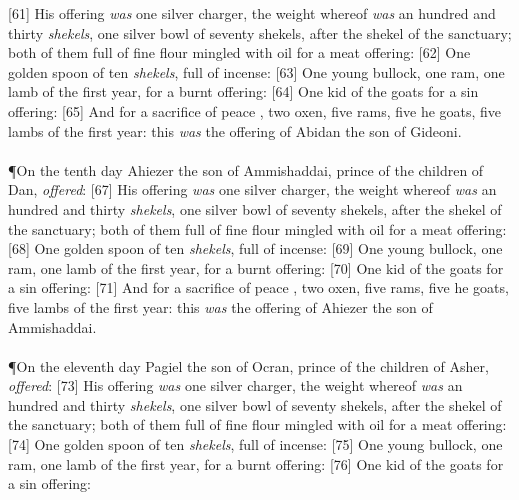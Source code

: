[61] \textcolor[cmyk]{0.99998,1,0,0}{His offering \emph{was} one silver charger, the weight whereof \emph{was} an hundred and thirty \emph{shekels}, one silver bowl of seventy shekels, after the shekel of the sanctuary; both of them full of fine flour mingled with oil for a meat offering:}
[62] \textcolor[cmyk]{0.99998,1,0,0}{One golden spoon of ten \emph{shekels}, full of incense:}
[63] \textcolor[cmyk]{0.99998,1,0,0}{One young bullock, one ram, one lamb of the first year, for a burnt offering:}
[64] \textcolor[cmyk]{0.99998,1,0,0}{One kid of the goats for a sin offering:}
[65] \textcolor[cmyk]{0.99998,1,0,0}{And for a sacrifice of peace , two oxen, five rams, five he goats, five lambs of the first year: this \emph{was} the offering of Abidan the son of Gideoni.}\\
\\
\P \textcolor[cmyk]{0.99998,1,0,0}{On the tenth day Ahiezer the son of Ammishaddai, prince of the children of Dan, \emph{offered}:}
[67] \textcolor[cmyk]{0.99998,1,0,0}{His offering \emph{was} one silver charger, the weight whereof \emph{was} an hundred and thirty \emph{shekels}, one silver bowl of seventy shekels, after the shekel of the sanctuary; both of them full of fine flour mingled with oil for a meat offering:}
[68] \textcolor[cmyk]{0.99998,1,0,0}{One golden spoon of ten \emph{shekels}, full of incense:}
[69] \textcolor[cmyk]{0.99998,1,0,0}{One young bullock, one ram, one lamb of the first year, for a burnt offering:}
[70] \textcolor[cmyk]{0.99998,1,0,0}{One kid of the goats for a sin offering:}
[71] \textcolor[cmyk]{0.99998,1,0,0}{And for a sacrifice of peace , two oxen, five rams, five he goats, five lambs of the first year: this \emph{was} the offering of Ahiezer the son of Ammishaddai.}\\
\\
\P \textcolor[cmyk]{0.99998,1,0,0}{On the eleventh day Pagiel the son of Ocran, prince of the children of Asher, \emph{offered}:}
[73] \textcolor[cmyk]{0.99998,1,0,0}{His offering \emph{was} one silver charger, the weight whereof \emph{was} an hundred and thirty \emph{shekels}, one silver bowl of seventy shekels, after the shekel of the sanctuary; both of them full of fine flour mingled with oil for a meat offering:}
[74] \textcolor[cmyk]{0.99998,1,0,0}{One golden spoon of ten \emph{shekels}, full of incense:}
[75] \textcolor[cmyk]{0.99998,1,0,0}{One young bullock, one ram, one lamb of the first year, for a burnt offering:}
[76] \textcolor[cmyk]{0.99998,1,0,0}{One kid of the goats for a sin offering:}
